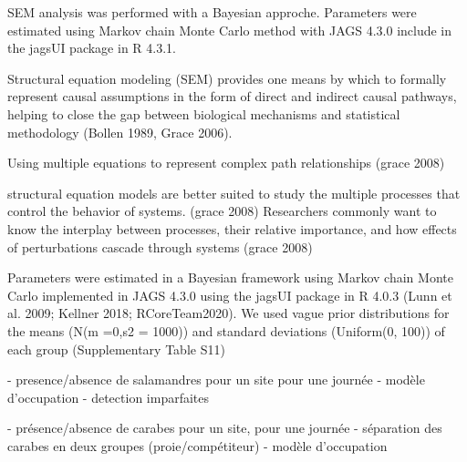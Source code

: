 SEM analysis was performed with a Bayesian approche. 
Parameters were estimated using Markov chain Monte Carlo method with JAGS 4.3.0 include in the jagsUI package in R 4.3.1. 

Structural equation modeling (SEM) provides one means by which to formally represent causal assumptions in the form of direct and indirect causal pathways, 
helping to close the gap between biological mechanisms and statistical methodology (Bollen 1989, Grace 2006).

Using multiple equations to represent complex path relationships (grace 2008)

structural equation models are better suited to study the multiple processes that control the behavior of systems. (grace 2008)
Researchers commonly want to know the interplay between processes, their relative importance, and how effects of perturbations cascade through systems (grace 2008)








Parameters were estimated in a Bayesian framework using Markov chain Monte Carlo implemented in JAGS 4.3.0 using the jagsUI package in R 4.0.3 
(Lunn et al. 2009; Kellner 2018; RCoreTeam2020). We used vague prior distributions for the means (N(m =0,s2 = 1000)) and standard deviations 
(Uniform(0, 100)) of each group (Supplementary Table S11)

- presence/absence de salamandres pour un site pour une journée 
- modèle d'occupation %
- detection imparfaites

- présence/absence de carabes pour un site, pour une journée 
- séparation des carabes en deux groupes (proie/compétiteur)
- modèle d'occupation

